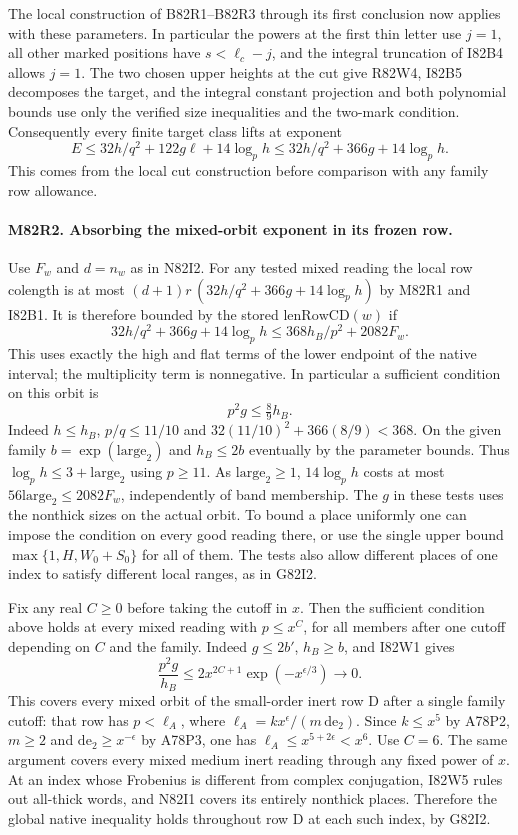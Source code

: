 The local construction of B82R1--B82R3 through its first
conclusion now applies with these parameters. In particular the
powers at the first thin letter use $j=1$, all other marked
positions have $s<\ell_c-j$, and the integral truncation of
I82B4 allows $j=1$. The two chosen upper heights at the cut
give R82W4, I82B5 decomposes the target, and the integral
constant projection and both polynomial bounds use only the
verified size inequalities and the two-mark condition.
Consequently every finite target class lifts at exponent
\[
          E\le32h/q^2+122g\ell+14\log_p h
             \le32h/q^2+366g+14\log_p h .
\]
This comes from the local cut construction before comparison
with any family row allowance.

\paragraph{M82R2. Absorbing the mixed-orbit exponent in its frozen row.}
Use $F_w$ and $d=n_w$ as in N82I2. For any tested mixed
reading the local row colength is at most
$(d+1)r\,(32h/q^2+366g+14\log_p h)$ by M82R1 and I82B1.
It is therefore bounded by the stored $\mathrm{lenRowCD}(w)$ if
\[
 32h/q^2+366g+14\log_p h
              \le368h_B/p^2+2082 F_w .
\]
This uses exactly the high and flat terms of the lower endpoint
of the native interval; the multiplicity term is nonnegative.
In particular a sufficient condition on this orbit is
\[
                         p^2g\le \tfrac89 h_B .
\]
Indeed $h\le h_B$, $p/q\le11/10$ and
$32(11/10)^2+366(8/9)<368$. On the given family
$b=\exp(\mathrm{large}_2)$ and $h_B\le2b$ eventually by
the parameter bounds. Thus $\log_p h\le3+\mathrm{large}_2$
using $p\ge11$. As $\mathrm{large}_2\ge1$, $14\log_p h$
costs at most $56\mathrm{large}_2\le2082F_w$,
independently of band membership. The $g$ in these tests uses
the nonthick sizes on the actual orbit. To bound a place
uniformly one can impose the condition on every good reading
there, or use the single upper bound
$\max\{1,H,W_0+S_0\}$ for all of them. The tests also allow
different places of one index to satisfy different local ranges,
as in G82I2.

Fix any real $C\ge0$ before taking the cutoff in $x$. Then the
sufficient condition above holds at every mixed reading with
$p\le x^C$, for all members after one cutoff depending on $C$
and the family. Indeed $g\le2b'$, $h_B\ge b$, and I82W1 gives
\[
     \frac{p^2g}{h_B}\le2x^{2C+1}\exp(-x^{\epsilon/3})
                      \longrightarrow0 .
\]
This covers every mixed orbit of the small-order inert row D
after a single family cutoff: that row has $p<\ell_A$, where
$\ell_A=k x^\epsilon/(m\,\mathrm{de}_2)$. Since $k\le x^5$
by A78P2, $m\ge2$ and $\mathrm{de}_2\ge x^{-\epsilon}$
by A78P3, one has $\ell_A\le x^{5+2\epsilon}<x^6$.
Use $C=6$. The same argument covers every mixed medium inert
reading through any fixed power of $x$. At an index whose
Frobenius is different from complex conjugation, I82W5 rules
out all-thick words, and N82I1 covers its entirely nonthick
places. Therefore the global native inequality holds throughout
row D at each such index, by G82I2.

